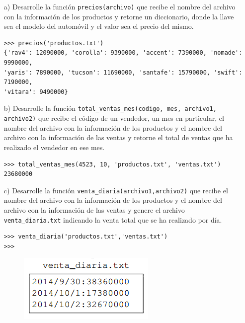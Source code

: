 \begin{itemize}
    \item[a)] Desarrolle la función \texttt{precios(archivo)} que recibe el nombre del archivo con la información de los productos y retorne un diccionario, donde la llave sea el modelo del automóvil y el valor sea el precio del mismo.
    
\begin{lstlisting}[style=consola]
>>> precios('productos.txt')
{'rav4': 12090000, 'corolla': 9390000, 'accent': 7390000, 'nomade': 9990000,
'yaris': 7890000, 'tucson': 11690000, 'santafe': 15790000, 'swift': 7190000,
'vitara': 9490000}
\end{lstlisting}

    \item[b)] Desarrolle la función \texttt{total\_ventas\_mes(codigo, mes, archivo1, archivo2)} que recibe el código de un vendedor, un mes en particular, el nombre del archivo con la información de los productos y el nombre del archivo con la información de las ventas y retorne el total de ventas que ha realizado el vendedor en ese mes.
    
\begin{lstlisting}[style=consola]
>>> total_ventas_mes(4523, 10, 'productos.txt', 'ventas.txt')
23680000
\end{lstlisting}
    \item[c)] Desarrolle la función \texttt{venta\_diaria(archivo1,archivo2)} que recibe el nombre del archivo con la información de los productos y el nombre del archivo con la información de las ventas y genere el archivo \texttt{venta\_diaria.txt} indicando la venta total que se ha realizado por día.
\begin{lstlisting}[style=consola]
>>> venta_diaria('productos.txt','ventas.txt')
>>>
\end{lstlisting}
\begin{figure}[h]
\centering
\includegraphics[scale=0.7]{Imagenes/ventadiaria.png}
\end{figure}
\end{itemize}
